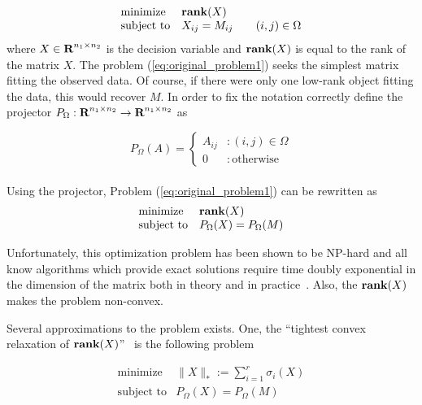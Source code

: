 \documentclass[12pt]{article}
\begin{document}
\begin{equation}
    \begin{array}{ll}
    \mbox{minimize}   &  \mathop{\bf rank}(X)\\
    \mbox{subject to} & X_{ij} = M_{ij} \qquad (i,j)\in \Omega
    \end{array}
    \label{eq:original_problem1}
\end{equation}
where $X\in {\mbox{\bf R}}^{n_1 \times n_2}$ is the decision variable and $\mathop{\bf rank}(X)$ is equal to the rank of the matrix $X$. The problem (\ref{eq:original_problem1}) seeks the simplest matrix fitting the observed data. Of course, if there were only one low-rank object fitting the data, this would recover $M$.  
In order to fix the notation correctly define the projector $P_{\Omega}:{\mbox{\bf R}}^{n_1\times n_2} \rightarrow {\mbox{\bf R}}^{n_1\times n_2} $ as

\begin{equation*}
P_{\Omega}(A) = \left \{ 
	\begin{array}{lr}
		A_{ij} & : (i,j) \in \Omega\\
		0 & : \mathrm{otherwise}
	\end{array}
	\right.
\end{equation*}\\
Using the projector, Problem (\ref{eq:original_problem1}) can be rewritten as
\begin{equation}
    \begin{array}{ll}
    \mbox{minimize}   &  \mathop{\bf rank}(X)\\
    \mbox{subject to} & P_{\Omega}(X) = P_{\Omega}(M)
    \end{array}
    \label{eq:original_problem2}
\end{equation}

Unfortunately, this optimization problem has been shown to be NP-hard and all know algorithms which provide exact solutions require time doubly exponential in the dimension of the matrix both in theory and in practice~\cite{Candes:2009}. Also, the $\mathop{\bf rank}(X)$ makes the problem non-convex. 

Several approximations to the problem exists. One, the ``tightest convex relaxation of $\mathop{\bf rank}(X)$''~\cite{Fazel:2002} is the following problem

\begin{equation}
    \begin{array}{ll}
    \mbox{minimize}   &  \|X\|_* :=\sum_{i=1}^r \sigma_i(X) \\
    \mbox{subject to} & P_{\Omega}(X) = P_{\Omega}(M)
    \end{array}
    \label{eq:nucl_problem}
\end{equation}
\end{document}
